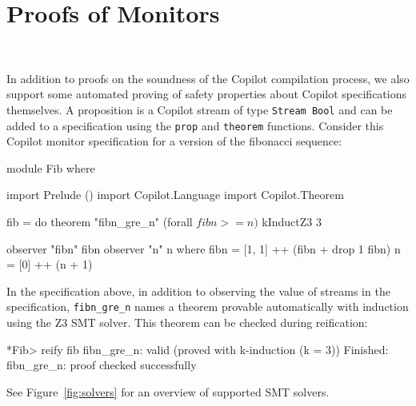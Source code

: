 \section{Proofs of Monitors}~\label{sec:proof}

In addition to proofs on the soundness of the Copilot compilation process, we
also support some automated proving of safety properties about Copilot
specifications themselves. A proposition is a Copilot stream of type
\lstinline{Stream Bool} and can be added to a specification using the
\lstinline{prop} and \lstinline{theorem} functions. Consider this Copilot
monitor specification for a version of the fibonacci sequence:

\begin{Haskell}
module Fib where

import Prelude ()
import Copilot.Language
import Copilot.Theorem

fib = do
  theorem "fibn_gre_n" (forall $ fibn >= n) $ kInductZ3 3

  observer "fibn" fibn
  observer "n"    n
  where
    fibn = [1, 1] ++ (fibn + drop 1 fibn)
    n = [0] ++ (n + 1)
\end{Haskell}

In the specification above, in addition to observing the value of streams in
the specification, \lstinline{fibn_gre_n} names a theorem provable
automatically with induction using the Z3 SMT solver. This theorem can be
checked during reification:

\begin{code}
*Fib> reify fib
fibn_gre_n: valid (proved with k-induction (k = 3))
Finished: fibn_gre_n: proof checked successfully
\end{code}

See Figure~\ref{fig:solvers} for an overview of supported SMT solvers.

\newcommand{\Yes}{\checkmark}
\newcommand{\No}{\textsf{X}}
\newcommand{\Some}{\textsf{Some}}

